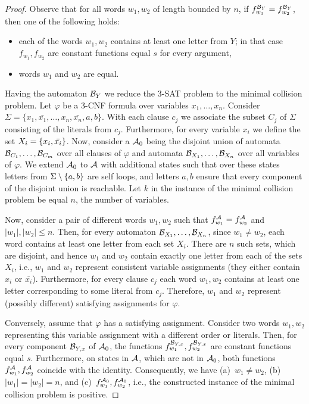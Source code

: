 \begin{proof}
Observe that for all words $w_1, w_2$ of length bounded by $n$, if $f^{\mathcal{B}_{Y}}_{w_1} = f^{\mathcal{B}_{Y}}_{w_2}$, then one of the following holds:
\begin{itemize}
    \item each of the words $w_1, w_2$ contains at least one letter from $Y$; in that case $f_{w_1}, f_{w_2}$ are constant functions equal 
    $s$ for every argument,
    \item words $w_1$ and $w_2$ are equal.
\end{itemize}

Having the automaton $\mathcal{B}_Y$ we reduce the 3-SAT problem to the minimal collision problem.
Let $\varphi$ be a 3-CNF formula over variables $x_1, \ldots, x_n$.
Consider $\Sigma = \{x_1, \bar{x_1}, \ldots, x_n, \bar{x_n}, a, b \}$.
With each clause $c_j$ we associate the subset $C_j$ of $\Sigma$ consisting of the literals from $c_j$.
Furthermore, for every variable $x_i$ we define the set $X_i = \{x_i, \bar{x_i}\}$.
Now, consider a \DFA $\mathcal{A}_0$ being the disjoint union of automata $\mathcal{B}_{C_1}, \ldots, \mathcal{B}_{C_m}$ over all clauses of $\varphi$ and
automata $\mathcal{B}_{X_1}, \ldots, \mathcal{B}_{X_n}$ over all variables of $\varphi$. 
We extend $\mathcal{A}_0$ to $\mathcal{A}$ with additional states such that over these states letters from $\Sigma \setminus \{a,b\}$ are self loops, and
letters $a,b$ ensure that every component of the disjoint union is reachable. 
Let $k$ in the instance of the minimal collision problem be equal $n$, the number of variables.

Now, consider a pair of different words $w_1, w_2$ such that $f^{\mathcal{A}}_{w_1} = f^{\mathcal{A}}_{w_2}$ and $|w_1|,|w_2| \leq n$.
Then, for every automaton $\mathcal{B}_{X_1}, \ldots, \mathcal{B}_{X_n}$, since $w_1 \neq w_2$, each word contains at least one letter from each set $X_i$.
There are $n$ such sets, which are disjoint, and hence $w_1$ and $w_2$ contain exactly one letter from each of the sets $X_i$, i.e., 
$w_1$ and $w_2$ represent consistent variable assignments (they either contain $x_i$ or $\bar{x_i}$).
Furthermore, for every clause $c_j$ each word $w_1, w_2$ contains at least one letter corresponding to some literal from $c_j$.
Therefore, $w_1$ and $w_2$ represent (possibly different) satisfying assignments for $\varphi$.

Conversely, assume that $\varphi$ has a satisfying assignment. 
Consider two words $w_1, w_2$ representing this variable assignment with a different order or literals.
Then, for every component $\mathcal{B}_{Y,x}$ of $\mathcal{A}_0$, the functions $f_{w_1}^{\mathcal{B}_{Y,x}}, f_{w_2}^{\mathcal{B}_{Y,x}}$ are constant functions equal $s$.
Furthermore, on states in $\mathcal{A}$, which are not in $\mathcal{A}_0$, both functions $f_{w_1}^{\mathcal{A}}, f_{w_2}^{\mathcal{A}}$ coincide with the identity.
Consequently, we have
(a)~$w_1 \neq w_2$, (b)~$|w_1| = |w_2| = n$, and
(c)~$f_{w_1}^{\mathcal{A}_0}, f_{w_2}^{\mathcal{A}_0}$, i.e., 
the constructed instance of the minimal collision problem is positive.
\end{proof}


